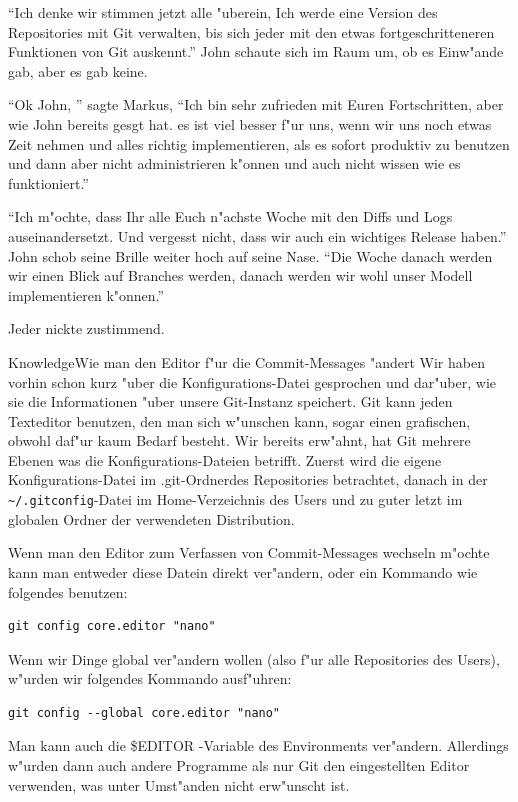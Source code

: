\begin{trenches}
``Ich denke wir stimmen jetzt alle "uberein, Ich werde eine Version des Repositories mit Git verwalten, bis sich jeder mit den etwas fortgeschritteneren Funktionen von Git auskennt.'' John schaute sich im Raum um, ob es Einw"ande gab, aber es gab keine.

``Ok John, '' sagte Markus, ``Ich bin sehr zufrieden mit Euren Fortschritten, aber wie John bereits gesgt hat. es ist viel besser f"ur uns, wenn wir uns noch etwas Zeit nehmen und alles richtig implementieren, als es sofort produktiv zu benutzen und dann aber nicht administrieren k"onnen und auch nicht wissen wie es funktioniert.''

``Ich m"ochte, dass Ihr alle Euch n"achste Woche mit den Diffs und Logs auseinandersetzt. Und vergesst nicht, dass wir auch ein wichtiges Release haben.'' John
schob seine Brille weiter hoch auf seine Nase. ``Die Woche danach werden wir einen Blick auf Branches werden, danach werden wir wohl unser Modell implementieren
k"onnen.''

Jeder nickte zustimmend.
\end{trenches}

\begin{callout}{Knowledge}{Wie man den Editor f"ur die Commit-Messages "andert} Wir haben vorhin schon kurz "uber die Konfigurations-Datei gesprochen und dar"uber, wie sie die Informationen "uber unsere Git-Instanz speichert. Git kann jeden Texteditor benutzen, den man sich w"unschen kann, sogar einen grafischen, obwohl daf"ur kaum Bedarf besteht. Wir bereits erw"ahnt, hat Git mehrere Ebenen was die Konfigurations-Dateien betrifft. Zuerst wird die eigene Konfigurations-Datei im .git-Ordnerdes Repositories betrachtet, danach in der \texttt{\textasciitilde/.gitconfig}-Datei im Home-Verzeichnis des Users und zu guter letzt im globalen Ordner der verwendeten Distribution.

Wenn man den Editor zum Verfassen von Commit-Messages wechseln m"ochte kann man entweder diese Datein direkt ver"andern, oder ein Kommando wie folgendes benutzen:

\begin{Verbatim}
git config core.editor "nano"
\end{Verbatim}

Wenn wir Dinge global ver"andern wollen (also f"ur alle Repositories des Users), w"urden wir folgendes Kommando ausf"uhren:

\begin{Verbatim}
git config --global core.editor "nano"
\end{Verbatim}

Man kann auch die \$EDITOR -Variable des Environments ver"andern. Allerdings w"urden dann auch andere Programme als nur Git den eingestellten Editor verwenden, was unter Umst"anden nicht erw"unscht ist.
\end{callout}


